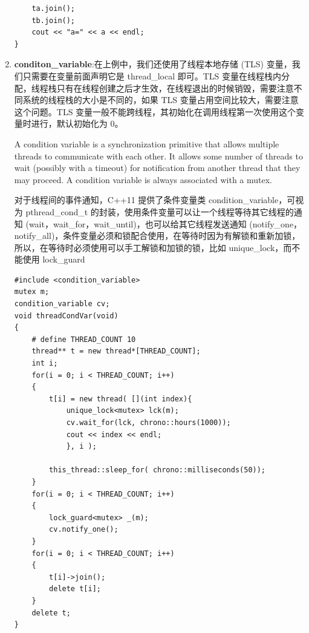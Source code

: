 \documentclass[UTF8,a4paper,12pt]{ctexbook}
\begin{document}
\begin{enumerate}[itemindent = 1em]
\begin{lstlisting}
	ta.join();
	tb.join();
	cout << "a=" << a << endl;
}
			\end{lstlisting}
			\item \textbf{conditon\_variable}:在上例中，我们还使用了线程本地存储 (TLS) 变量，我们只需要在变量前面声明它是 thread\_local 即可。TLS 变量在线程栈内分配，线程栈只有在线程创建之后才生效，在线程退出的时候销毁，需要注意不同系统的线程栈的大小是不同的，如果 TLS 变量占用空间比较大，需要注意这个问题。TLS 变量一般不能跨线程，其初始化在调用线程第一次使用这个变量时进行，默认初始化为 0。
			
			A condition variable is a synchronization primitive that allows multiple threads to communicate with each other. It allows some number of threads to wait (possibly with a timeout) for notification from another thread that they may proceed. A condition variable is always associated with a mutex.
			
			对于线程间的事件通知，C++11 提供了条件变量类 condition\_variable，可视为 pthread\_cond\_t 的封装，使用条件变量可以让一个线程等待其它线程的通知 (wait，wait\_for，wait\_until)，也可以给其它线程发送通知 (notify\_one，notify\_all)，条件变量必须和锁配合使用，在等待时因为有解锁和重新加锁，所以，在等待时必须使用可以手工解锁和加锁的锁，比如 unique\_lock，而不能使用 lock\_guard
			\begin{lstlisting}
#include <condition_variable>
mutex m;
condition_variable cv;
void threadCondVar(void)
{
	# define THREAD_COUNT 10
	thread** t = new thread*[THREAD_COUNT];
	int i;
	for(i = 0; i < THREAD_COUNT; i++)
	{
		t[i] = new thread( [](int index){
			unique_lock<mutex> lck(m);
			cv.wait_for(lck, chrono::hours(1000));
			cout << index << endl;
			}, i );
			
		this_thread::sleep_for( chrono::milliseconds(50));
	}
	for(i = 0; i < THREAD_COUNT; i++)
	{
		lock_guard<mutex> _(m);
		cv.notify_one();
	}
	for(i = 0; i < THREAD_COUNT; i++)
	{
		t[i]->join();
		delete t[i];
	}
	delete t;
}
			\end{lstlisting}
		\end{enumerate}
\end{document}

